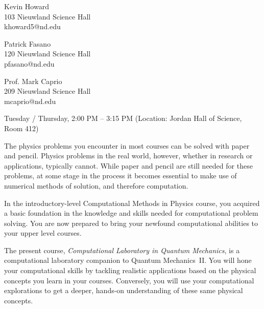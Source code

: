 \documentclass[12pt]{mcplain}
\begin{document}


\begin{multicols}{3}

Kevin Howard\\
103 Nieuwland Science Hall\\
khoward5@nd.edu

\columnbreak
Patrick Fasano\\
120 Nieuwland Science Hall\\
pfasano@nd.edu

\columnbreak

Prof. Mark Caprio\\
209 Nieuwland Science Hall\\
mcaprio@nd.edu
\end{multicols}


\syllabusseparator


\begin{leftindent}
 Tuesday / Thursday, 2:00 PM -- 3:15 PM (Location: Jordan Hall of Science, Room 412)
\end{leftindent}



The physics problems you encounter in most courses can be solved with paper and
pencil. Physics problems in the real world, however, whether in research or
applications, typically cannot. While paper and pencil are still needed for
these problems, at some stage in the process it becomes essential to make use of
numerical methods of solution, and therefore computation.

In the introductory-level Computational Methods in Physics course, you acquired
a basic foundation in the knowledge and skills needed for computational problem
solving.  You are now prepared to bring your newfound computational abilities to
your upper level courses.

The present course, \textit{Computational Laboratory in Quantum Mechanics}, is a
computational laboratory companion to Quantum Mechanics~II.  You will hone your
computational skills by tackling realistic applications based on the physical
concepts you learn in your courses.  Conversely, you will use your computational
explorations to get a deeper, hands-on understanding of these same physical
concepts.
\end{document}
